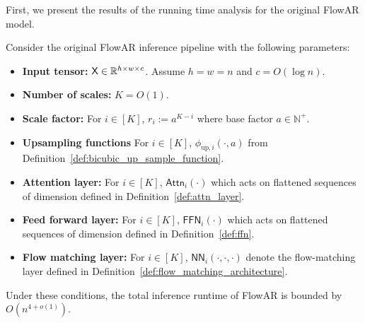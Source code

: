 First, we present the results of the running time analysis for the original FlowAR model.
\begin{lemma}\label{lem:runtime_old_flowar_informal}
    Consider the original FlowAR inference pipeline with the following parameters:
    \begin{itemize}
        \item {\bf Input tensor:} $\mathsf{X} \in \mathbb{R}^{h \times w \times c}$. Assume $h=w=n$ and $c = O(\log n)$.
        \item {\bf Number of scales:} $K = O(1)$.
        \item {\bf Scale factor:} For $i \in [K]$, $r_i:= a^{K-i}$ where base factor $a \in \mathbb{N}^+$.
        \item {\bf Upsampling functions}  For $i \in [K]$, $\phi_{\mathrm{up},i}(\cdot,a)$ from Definition~\ref{def:bicubic_up_sample_function}.
        \item {\bf Attention layer:}  For $i \in [K]$, $\mathsf{Attn}_i(\cdot)$ which acts on flattened sequences of dimension defined in Definition~\ref{def:attn_layer}.
        \item {\bf Feed forward layer: } For $i \in [K]$, $\mathsf{FFN}_i(\cdot)$ which acts on flattened sequences of dimension defined in Definition~\ref{def:ffn}.
        \item {\bf Flow matching layer:} For $i \in [K]$, $\mathsf{NN}_i(\cdot,\cdot,\cdot)$ denote the flow-matching layer defined in Definition~\ref{def:flow_matching_architecture}.
    \end{itemize}
    Under these conditions, the total inference runtime of FlowAR is bounded by $O(n^{4+o(1)})$.
\end{lemma}

